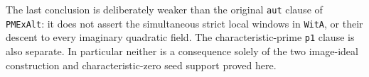 The last conclusion is deliberately weaker than the original
\texttt{aut} clause of \texttt{PMExAlt}: it does not assert
the simultaneous strict local windows in \texttt{WitA}, or
their descent to every imaginary quadratic field. The
characteristic-prime \texttt{p1} clause is also separate.
In particular neither is a consequence solely of the two
image-ideal construction and characteristic-zero seed
support proved here.
